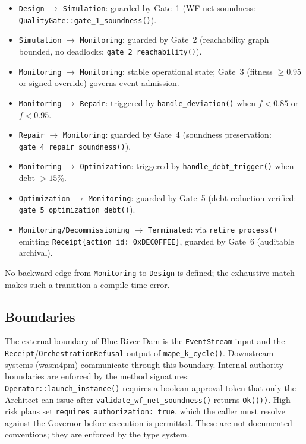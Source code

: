\begin{itemize}
  \item \texttt{Design} $\to$ \texttt{Simulation}: guarded by Gate~1
    (WF-net soundness: \texttt{QualityGate::gate\_1\_soundness()}).
  \item \texttt{Simulation} $\to$ \texttt{Monitoring}: guarded by Gate~2
    (reachability graph bounded, no deadlocks: \texttt{gate\_2\_reachability()}).
  \item \texttt{Monitoring} $\to$ \texttt{Monitoring}: stable operational
    state; Gate~3 (fitness $\geq 0.95$ or signed override) governs event
    admission.
  \item \texttt{Monitoring} $\to$ \texttt{Repair}: triggered by
    \texttt{handle\_deviation()} when $f < 0.85$ or $f < 0.95$.
  \item \texttt{Repair} $\to$ \texttt{Monitoring}: guarded by Gate~4
    (soundness preservation: \texttt{gate\_4\_repair\_soundness()}).
  \item \texttt{Monitoring} $\to$ \texttt{Optimization}: triggered by
    \texttt{handle\_debt\_trigger()} when debt $> 15\%$.
  \item \texttt{Optimization} $\to$ \texttt{Monitoring}: guarded by Gate~5
    (debt reduction verified: \texttt{gate\_5\_optimization\_debt()}).
  \item \texttt{Monitoring/Decommissioning} $\to$ \texttt{Terminated}: via
    \texttt{retire\_process()} emitting \texttt{Receipt\{action\_id:
    0xDEC0FFEE\}}, guarded by Gate~6 (auditable archival).
\end{itemize}

No backward edge from \texttt{Monitoring} to \texttt{Design} is defined;
the exhaustive match makes such a transition a compile-time error.

\subsection{Boundaries}
\label{sec:blue-river-dam-architecture-boundaries}

The external boundary of Blue River Dam is the \texttt{EventStream} input and
the \texttt{Receipt}/\texttt{OrchestrationRefusal} output of
\texttt{mape\_k\_cycle()}. Downstream systems (wasm4pm) communicate through
this boundary. Internal authority boundaries are enforced by the method
signatures: \texttt{Operator::launch\_instance()} requires a boolean approval
token that only the Architect can issue after \texttt{validate\_wf\_net\_soundness()}
returns \texttt{Ok(())}. High-risk plans set \texttt{requires\_authorization:
true}, which the caller must resolve against the Governor before execution is
permitted. These are not documented conventions; they are enforced by the type
system.

